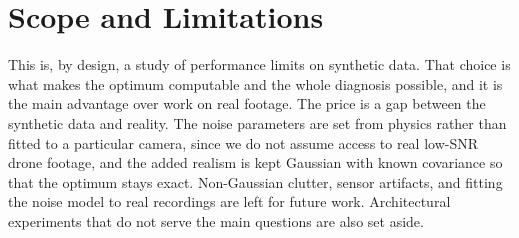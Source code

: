 \documentclass[11pt]{article}
\begin{document}
\section{Scope and Limitations}
\label{sec:scope}
This is, by design, a study of performance limits on synthetic data. That choice
is what makes the optimum computable and the whole diagnosis possible, and it is
the main advantage over work on real footage. The price is a gap between the
synthetic data and reality. The noise parameters are set from physics rather than
fitted to a particular camera, since we do not assume access to real low-SNR
drone footage, and the added realism is kept Gaussian with known covariance so
that the optimum stays exact. Non-Gaussian clutter, sensor artifacts, and fitting
the noise model to real recordings are left for future work. Architectural
experiments that do not serve the main questions are also set aside.
\end{document}
